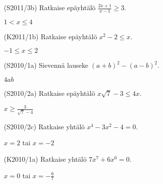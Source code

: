 \begin{multicols}{2}

\begin{tehtava}
  (S2011/3b) Ratkaise epäyhtälö $\frac{2x+1}{x-1} \geq 3$.
\begin{vastaus}
$1<x \leq 4$
\end{vastaus}
\end{tehtava}

\begin{tehtava}
(K2011/1b) Ratkaise epäyhtälö $x^2-2 \leq x$.
\begin{vastaus}
$-1 \leq x \leq 2$
\end{vastaus}
\end{tehtava}

\begin{tehtava}
(S2010/1a) Sievennä lauseke $(a+b)^2-(a-b)^2$.
\begin{vastaus}
$4ab$
\end{vastaus}
\end{tehtava}

\begin{tehtava}
(S2010/2a) Ratkaise epäyhtälö $x\sqrt{7}-3 \leq 4x$.
\begin{vastaus}
$x \geq \frac{3}{\sqrt{7}-4}$
\end{vastaus}
\end{tehtava}

\begin{tehtava}
(S2010/2c) Ratkaise yhtälö $x^4-3x^2-4=0$.
\begin{vastaus}
$x=2$ tai $x=-2$
\end{vastaus}
\end{tehtava}


\begin{tehtava}
(K2010/1a) Ratkaise yhtälö $7x^7+6x^6=0$.
\begin{vastaus}
$x=0$ tai $x=-\frac{6}{7}$
\end{vastaus}
\end{tehtava}


\end{multicols}

